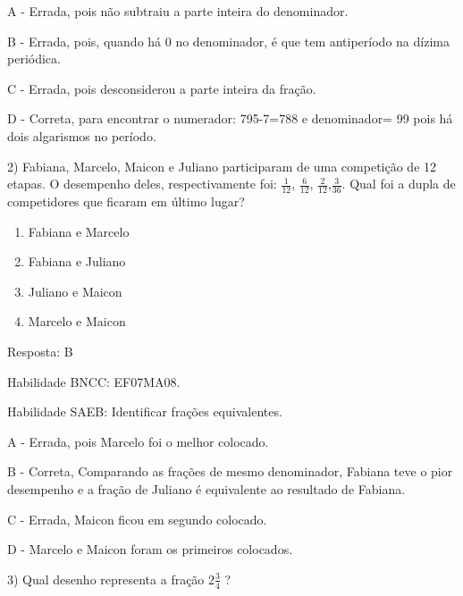 A - Errada, pois não subtraiu a parte inteira do denominador.

B - Errada, pois, quando há 0 no denominador, é que tem antiperíodo na
dízima periódica.

C - Errada, pois desconsiderou a parte inteira da fração.

D - Correta, para encontrar o numerador: 795-7=788 e denominador= 99
pois há dois algarismos no período.

2) Fabiana, Marcelo, Maicon e Juliano participaram de uma competição de
12 etapas. O desempenho deles, respectivamente foi: \(\frac{1}{12}\),
\(\frac{6}{12}\), \(\frac{2}{12}\),\(\frac{3}{36}\). Qual foi a dupla de
competidores que ficaram em último lugar?

\begin{enumerate}
\def\labelenumi{\alph{enumi})}
\item
  Fabiana e Marcelo
\item
  Fabiana e Juliano
\item
  Juliano e Maicon
\item
  Marcelo e Maicon
\end{enumerate}

Resposta: B

Habilidade BNCC: EF07MA08.

Habilidade SAEB: Identificar frações equivalentes.

A - Errada, pois Marcelo foi o melhor colocado.

B - Correta, Comparando as frações de mesmo denominador, Fabiana teve o
pior desempenho e a fração de Juliano é equivalente ao resultado de
Fabiana.

C - Errada, Maicon ficou em segundo colocado.

D - Marcelo e Maicon foram os primeiros colocados.

3) Qual desenho representa a fração \(2\frac{3}{4}\) ?

